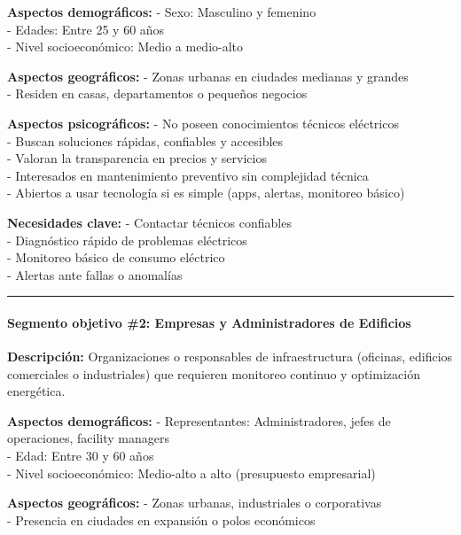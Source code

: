 \textbf{Aspectos demográficos:} - Sexo: Masculino y femenino\\
- Edades: Entre 25 y 60 años\\
- Nivel socioeconómico: Medio a medio-alto

\textbf{Aspectos geográficos:} - Zonas urbanas en ciudades medianas y
grandes\\
- Residen en casas, departamentos o pequeños negocios

\textbf{Aspectos psicográficos:} - No poseen conocimientos técnicos
eléctricos\\
- Buscan soluciones rápidas, confiables y accesibles\\
- Valoran la transparencia en precios y servicios\\
- Interesados en mantenimiento preventivo sin complejidad técnica\\
- Abiertos a usar tecnología si es simple (apps, alertas, monitoreo
básico)

\textbf{Necesidades clave:} - Contactar técnicos confiables\\
- Diagnóstico rápido de problemas eléctricos\\
- Monitoreo básico de consumo eléctrico\\
- Alertas ante fallas o anomalías

\begin{center}\rule{0.5\linewidth}{0.5pt}\end{center}

\paragraph{Segmento objetivo \#2: Empresas y Administradores de
Edificios}\label{report__10-cap1-introduccion.md__segmento-objetivo-2-empresas-y-administradores-de-edificios}

\hfill\break

\textbf{Descripción:} Organizaciones o responsables de infraestructura
(oficinas, edificios comerciales o industriales) que requieren monitoreo
continuo y optimización energética.

\textbf{Aspectos demográficos:} - Representantes: Administradores, jefes
de operaciones, facility managers\\
- Edad: Entre 30 y 60 años\\
- Nivel socioeconómico: Medio-alto a alto (presupuesto empresarial)

\textbf{Aspectos geográficos:} - Zonas urbanas, industriales o
corporativas\\
- Presencia en ciudades en expansión o polos económicos

